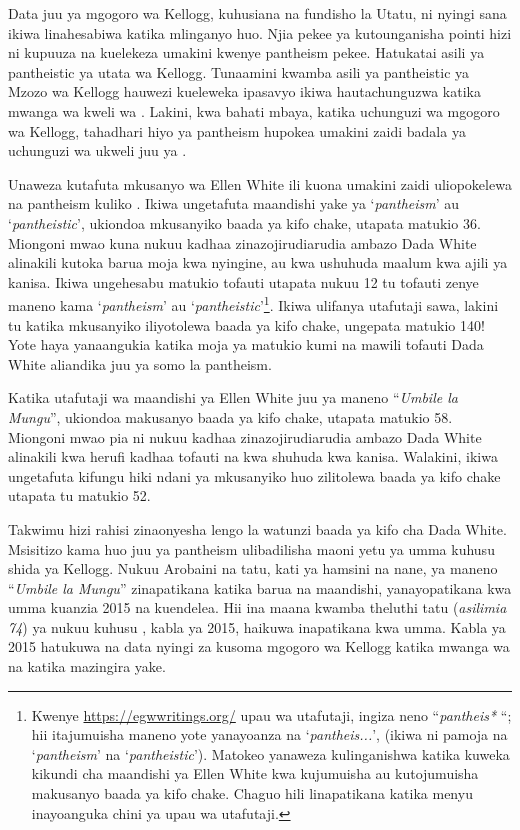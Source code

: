 Data juu ya mgogoro wa Kellogg, kuhusiana na fundisho la Utatu, ni nyingi sana ikiwa  linahesabiwa katika mlinganyo huo. Njia pekee ya kutounganisha pointi hizi ni kupuuza  na kuelekeza umakini kwenye pantheism pekee. Hatukatai asili ya pantheistic ya utata wa Kellogg. Tunaamini kwamba asili ya pantheistic ya Mzozo wa Kellogg hauwezi kueleweka ipasavyo ikiwa hautachunguzwa katika mwanga wa kweli wa . Lakini, kwa bahati mbaya, katika uchunguzi wa mgogoro wa Kellogg, tahadhari hiyo ya pantheism hupokea umakini zaidi badala ya uchunguzi wa ukweli juu ya .

Unaweza kutafuta mkusanyo wa Ellen White ili kuona umakini zaidi uliopokelewa na pantheism kuliko . Ikiwa ungetafuta maandishi yake ya ‘\textit{pantheism}’ au ‘\textit{pantheistic}’, ukiondoa mkusanyiko baada ya kifo chake, utapata matukio 36. Miongoni mwao kuna nukuu kadhaa zinazojirudiarudia ambazo Dada White alinakili kutoka barua moja kwa nyingine, au kwa ushuhuda maalum kwa ajili ya kanisa. Ikiwa ungehesabu matukio tofauti utapata nukuu 12 tu tofauti zenye maneno kama ‘\textit{pantheism}’ au ‘\textit{pantheistic}’\footnote{Kwenye \href{https://egwwritings.org/}{https://egwwritings.org/} upau wa utafutaji, ingiza neno “\textit{pantheis*} “; hii itajumuisha maneno yote yanayoanza na ‘\textit{pantheis...}’, (ikiwa ni pamoja na ‘\textit{pantheism}’ na ‘\textit{pantheistic}’). Matokeo yanaweza kulinganishwa katika kuweka kikundi cha maandishi ya Ellen White kwa kujumuisha au kutojumuisha makusanyo baada ya kifo chake. Chaguo hili linapatikana katika menyu inayoanguka chini ya upau wa utafutaji.}. Ikiwa ulifanya utafutaji sawa, lakini tu katika mkusanyiko iliyotolewa baada ya kifo chake, ungepata matukio 140! Yote haya yanaangukia katika moja ya matukio kumi na mawili tofauti Dada White aliandika juu ya somo la pantheism.

Katika utafutaji wa maandishi ya Ellen White juu ya maneno “\textit{Umbile la Mungu}”, ukiondoa makusanyo baada ya kifo chake, utapata matukio 58. Miongoni mwao pia ni nukuu kadhaa zinazojirudiarudia ambazo Dada White alinakili kwa herufi kadhaa tofauti na kwa shuhuda kwa kanisa. Walakini, ikiwa ungetafuta kifungu hiki ndani ya mkusanyiko huo zilitolewa baada ya kifo chake utapata tu matukio 52.

Takwimu hizi rahisi zinaonyesha lengo la watunzi baada ya kifo cha Dada White. Msisitizo kama huo juu ya pantheism ulibadilisha maoni yetu ya umma kuhusu shida ya Kellogg. Nukuu Arobaini na tatu, kati ya hamsini na nane, ya maneno “\textit{Umbile la Mungu}” zinapatikana katika barua na maandishi, yanayopatikana kwa umma kuanzia 2015 na kuendelea. Hii ina maana kwamba theluthi tatu (\textit{asilimia 74}) ya nukuu kuhusu , kabla ya 2015, haikuwa inapatikana kwa umma. Kabla ya 2015 hatukuwa na data nyingi za kusoma mgogoro wa Kellogg katika mwanga wa  na katika mazingira yake.



